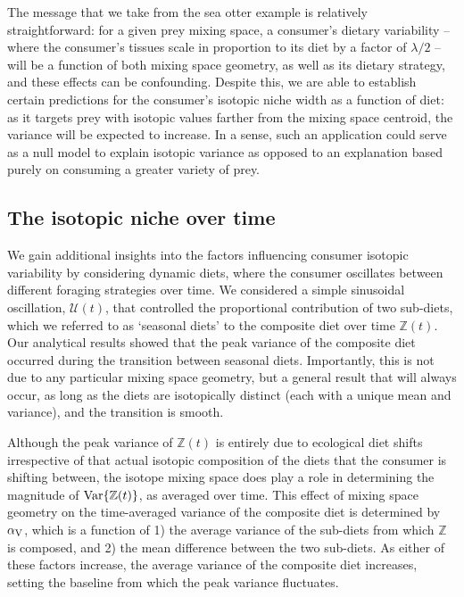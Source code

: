 \documentclass{frontiersSCNS}
\begin{document}
The message that we take from the sea otter example is relatively straightforward: for a given prey mixing space, a consumer's dietary variability -- where the consumer's tissues scale in proportion to its diet by a factor of $\lambda/2$ -- will be a function of both mixing space geometry, as well as its dietary strategy, and these effects can be confounding.
Despite this, we are able to establish certain predictions for the consumer's isotopic niche width as a function of diet: as it targets prey with isotopic values farther from the mixing space centroid, the variance will be expected to increase.
In a sense, such an application could serve as a null model to explain isotopic variance as opposed to an explanation based purely on consuming a greater variety of prey.




\subsection{The isotopic niche over time}

We gain additional insights into the factors influencing consumer isotopic variability by considering dynamic diets, where the consumer oscillates between different foraging strategies over time.
We considered a simple sinusoidal oscillation, $\mathcal{U}(t)$, that controlled the proportional contribution of two sub-diets, which we referred to as `seasonal diets' to the composite diet over time $\mathbb{Z}(t)$.
Our analytical results showed that the peak variance of the composite diet occurred during the transition between seasonal diets.
Importantly, this is not due to any particular mixing space geometry, but a general result that will always occur, as long as the diets are isotopically distinct (each with a unique mean and variance), and the transition is smooth.

Although the peak variance of $\mathbb{Z}(t)$ is entirely due to ecological diet shifts irrespective of that actual isotopic composition of the diets that the consumer is shifting between, the isotope mixing space does play a role in determining the magnitude of ${\rm Var}\{\mathbb{Z}(t)\}$, as averaged over time.
This effect of mixing space geometry on the time-averaged variance of the composite diet is determined by $\alpha_{\rm V}$, which is a function of
1) the average variance of the sub-diets from which $\mathbb{Z}$ is composed, and 
2) the mean difference between the two sub-diets.
As either of these factors increase, the average variance of the composite diet increases, setting the baseline from which the peak variance fluctuates.
\end{document}

